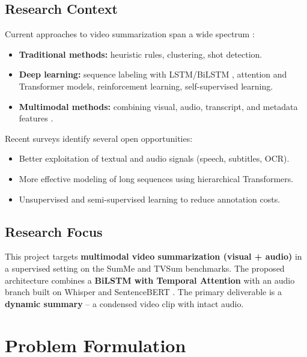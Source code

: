 \documentclass[12pt, a4paper]{report}
\begin{document}
\section{Research Context}

Current approaches to video summarization span a wide spectrum \cite{apostolidis2021}:
\begin{itemize}
  \item \textbf{Traditional methods:} heuristic rules, clustering, shot detection.
  \item \textbf{Deep learning:} sequence labeling with LSTM/BiLSTM \cite{zhang2016},
        attention and Transformer models, reinforcement learning, self-supervised
        learning.
  \item \textbf{Multimodal methods:} combining visual, audio, transcript, and metadata
        features \cite{psallidas2021,hu2023}.
\end{itemize}

Recent surveys \cite{apostolidis2021} identify several open opportunities:
\begin{itemize}
  \item Better exploitation of textual and audio signals (speech, subtitles, OCR).
  \item More effective modeling of long sequences using hierarchical Transformers.
  \item Unsupervised and semi-supervised learning to reduce annotation costs.
\end{itemize}

\section{Research Focus}

This project targets \textbf{multimodal video summarization (visual + audio)} in a
supervised setting on the SumMe \cite{gygli2014} and TVSum \cite{song2015} benchmarks.
The proposed architecture combines a \textbf{BiLSTM with Temporal Attention}
\cite{zhang2016} with an audio branch built on Whisper \cite{radford2023} and
SentenceBERT \cite{reimers2019}. The primary deliverable is a \textbf{dynamic summary}
-- a condensed video clip with intact audio.

\chapter{Problem Formulation}
\end{document}
